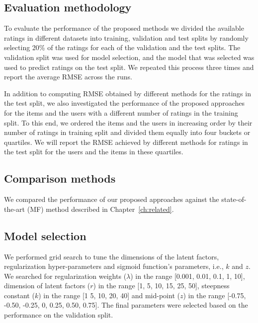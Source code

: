 \fi


\subsection{Evaluation methodology}
To evaluate the performance of the proposed methods we divided the available
ratings in different datasets into training, validation and test splits by
randomly selecting 20\% of the ratings for each of the validation and the test
splits. The validation split was used for model selection, and the model that
was selected was used to predict ratings on the test split. We repeated this
process three times and report the average RMSE across the runs.


In addition to computing RMSE obtained by different methods for the ratings in
the test split, we also investigated the performance of the proposed approaches
for the items and the users with a different number of ratings in the training
split. To this end, we ordered the items and the users in increasing order by
their number of ratings in training split and divided them equally into four
buckets or quartiles. We will report the RMSE achieved by different methods for ratings in
the test split for the users and the items in these quartiles. 

\subsection{Comparison methods}
We compared the performance of our proposed approaches against the
state-of-the-art \MF (MF) method described in Chapter~\ref{ch:related}.



\subsection{Model selection}
We performed grid search to tune the dimensions of the latent factors,
regularization hyper-parameters and sigmoid function's parameters, i.e., $k$ and
$z$. We searched for regularization weights ($\lambda$) in the range [0.001,
0.01, 0.1, 1, 10], dimension of latent factors ($r$) in the range [1, 5, 10, 15,
25, 50], steepness constant ($k$) in the range [1 5, 10, 20, 40] and mid-point
($z$) in the range [-0.75, -0.50, -0.25, 0, 0.25, 0.50, 0.75]. The final parameters were selected based
on the performance on the validation split.